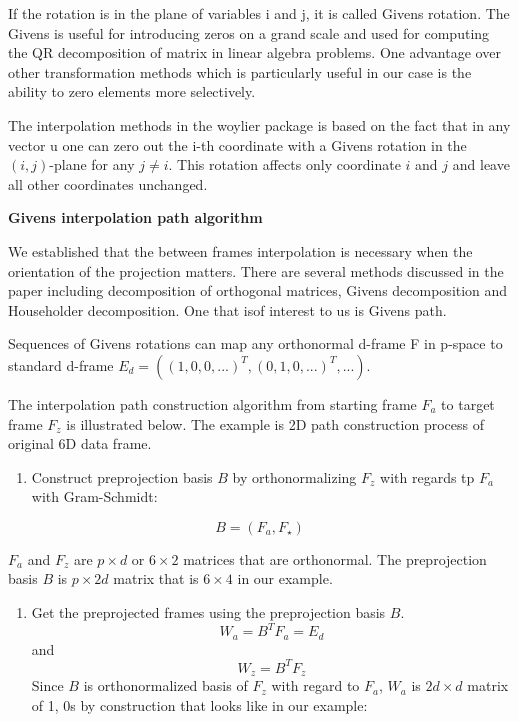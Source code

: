 If the rotation is in the plane of variables i and j, it is called Givens rotation. The Givens is useful for introducing zeros on a grand scale and used for computing the QR decomposition of matrix in linear algebra problems. One advantage over other transformation methods which is particularly useful in our case is the ability to zero elements more selectively.

The interpolation methods in the woylier package is based on the fact that in any vector u one can zero out the i-th coordinate with a Givens rotation in the \((i, j)\)-plane for any \(j\neq i\). This rotation affects only coordinate \(i\) and \(j\) and leave all other coordinates unchanged.

\textbf{Givens interpolation path algorithm}

We established that the between frames interpolation is necessary when the orientation of the projection matters. There are several methods discussed in the paper including decomposition of orthogonal matrices, Givens decomposition and Householder decomposition. One that isof interest to us is Givens path.

Sequences of Givens rotations can map any orthonormal d-frame F in p-space to standard d-frame \(E_d=((1, 0, 0, ...)^T, (0, 1, 0, ...)^T, ...)\).

The interpolation path construction algorithm from starting frame \(F_a\) to target frame \(F_z\) is illustrated below. The example is 2D path construction process of original 6D data frame.

\begin{enumerate}
\def\labelenumi{\arabic{enumi}.}
\tightlist
\item
  Construct preprojection basis \(B\) by orthonormalizing \(F_z\) with regards tp \(F_a\) with Gram-Schmidt:
\end{enumerate}

\[B = (F_a, F_{\star})\]

\(F_a\) and \(F_z\) are \(p\times d\) or \(6\times2\) matrices that are orthonormal. The preprojection basis \(B\) is \(p\times 2d\) matrix that is \(6\times 4\) in our example.

\begin{enumerate}
\def\labelenumi{\arabic{enumi}.}
\setcounter{enumi}{1}
\tightlist
\item
  Get the preprojected frames using the preprojection basis \(B\).
  \[W_a = B^TF_a = E_d\] and \[W_z = B^TF_z\]
  Since \(B\) is orthonormalized basis of \(F_z\) with regard to \(F_a\), \(W_a\) is \(2d\times d\) matrix of 1, 0s by construction that looks like in our example:
\end{enumerate}

